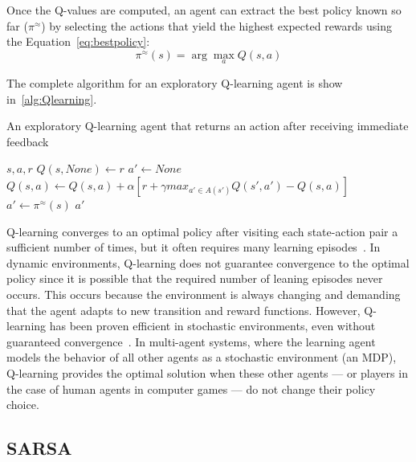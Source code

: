 Once the Q-values are computed, an agent can extract the best policy known so far ($\pi^{\approx}$) by selecting the actions that yield the highest expected rewards using the Equation~\ref{eq:bestpolicy}:
\begin{equation} \label{eq:bestpolicy}
	\pi^{\approx}(s) = \arg\max_{a}Q(s,a)
\end{equation}

The complete algorithm for an exploratory Q-learning agent is show in~\ref{alg:Qlearning}.

\begin{algorithm}
	\caption{An exploratory Q-learning agent that returns an action after receiving immediate feedback}
	\label{alg:Qlearning}
	\begin{algorithmic}[1]
		\REQUIRE $s, a, r$
			\STATE $Q(s,None) \gets r$
			\STATE $a' \gets None$
		\ELSE
			\STATE $Q(s,a) \gets Q(s,a) + \alpha[r + \gamma max_{a' \in A(s')}Q(s',a') - Q(s,a)]$
			\STATE $a' \gets \pi^{\approx}(s)$
		\ENDIF
		\RETURN $a'$
	\end{algorithmic}
\end{algorithm}

Q-learning converges to an optimal policy after visiting each state-action pair a sufficient number of times, but it often requires many learning episodes~\cite{watkins1992technical}.
In dynamic environments, Q-learning does not guarantee convergence to the optimal policy since it is possible that the required number of leaning episodes never occurs.
This occurs because the environment is always changing and demanding that the agent adapts to new transition and reward functions.
However, Q-learning has been proven efficient in stochastic environments, even without guaranteed convergence~\cite{sandholm1996multiagent,tesauro2002pricing,amato2010highlevel}.
In multi-agent systems, where the learning agent models the behavior of all other agents as a stochastic environment (an MDP), Q-learning provides the optimal solution when these other agents
--- or players in the case of human agents in computer games --- do not change their policy choice. 



\subsection{SARSA}
\label{subsec:sarsa}

